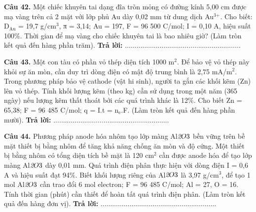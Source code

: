 \documentclass{article}
\begin{document}
\fontsize{24}{32}\selectfont
\textbf{Câu 42.} Một chiếc khuyên tai dạng đĩa tròn mỏng có đường kính 5,00 cm được mạ vàng trên cả 2 mặt với lớp phủ Au dày 0,02 mm từ dung dịch Au$^{\text{3+}}$. Cho biết: D$_{\text{Au}}$ = 19,7 g/cm$^{\text{3}}$, π = 3,14; Au = 197, F = 96 500 C/mol; I = 0,10 A, hiệu suất 100\%. Thời gian để mạ vàng cho chiếc khuyên tai là bao nhiêu giờ? (Làm tròn kết quả đến hàng phần trăm).
\vspace{12pt}
\textbf{Trả lời:} $\dots\dots\dots\dots\dots\dots\dots\dots\dots\dots\dots\dots\dots\dots\dots\dots\dots\dots\dots\dots$
\vspace*{\fill}
\newpage

\fontsize{24}{32}\selectfont
\textbf{Câu 43.} Một con tàu có phần vỏ thép diện tích 1000 m$^{\text{2}}$. Để bảo vệ vỏ thép này khỏi sự ăn mòn, cần duy trì dòng điện có mật độ trung bình là 2,75 mA/m$^{\text{2}}$. Trong phương pháp bảo vệ cathode (vật hi sinh), người ta gắn các khối kẽm (Zn) lên vỏ thép. Tính khối lượng kẽm (theo kg) cần sử dụng trong một năm (365 ngày) nếu lượng kẽm thất thoát bởi các quá trình khác là 12\%. Cho biết Zn = 65,38; F = 96 485 C/mol; q = I.t = n$_{\text{e}}$.F. (Làm tròn kết quả đến hàng phần mười).
\vspace{12pt}
\textbf{Trả lời:} $\dots\dots\dots\dots\dots\dots\dots\dots\dots\dots\dots\dots\dots\dots\dots\dots\dots\dots\dots\dots$
\vspace*{\fill}
\newpage

\fontsize{24}{32}\selectfont
\textbf{Câu 44.} Phương pháp anode hóa nhôm tạo lớp màng Al$\textit{{\text{2}}$O$}{\text{3}}$ bền vững trên bề mặt thiết bị bằng nhôm để tăng khả năng chống ăn mòn và độ cứng. Một thiết bị bằng nhôm có tổng diện tích bề mặt là 120 cm$^{\text{2}}$ cần được anode hóa để tạo lớp màng Al$\textit{{\text{2}}$O$}{\text{3}}$ dày 0,01 mm. Quá trình điện phân thực hiện với dòng điện I = 0,6 A và hiệu suất đạt 94\%. Biết khối lượng riêng của Al$\textit{{\text{2}}$O$}{\text{3}}$ là 3,97 g/cm$^{\text{3}}$, để tạo 1 mol Al$\textit{{\text{2}}$O$}{\text{3}}$ cần trao đổi 6 mol electron; F = 96 485 C/mol; Al = 27, O = 16. Tính thời gian (phút) cần thiết để hoàn tất quá trình điện phân. (Làm tròn kết quả đến hàng đơn vị).
\vspace{12pt}
\textbf{Trả lời:} $\dots\dots\dots\dots\dots\dots\dots\dots\dots\dots\dots\dots\dots\dots\dots\dots\dots\dots\dots\dots$
\vspace*{\fill}
\newpage
\end{document}
